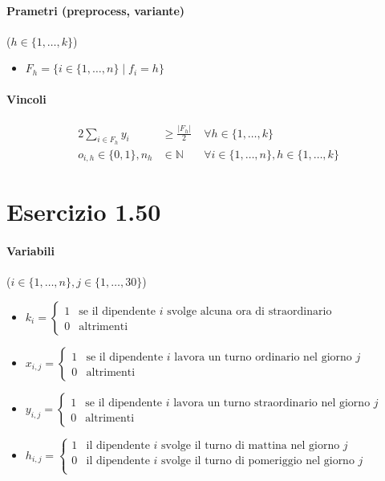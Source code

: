 \documentclass{article}
\begin{document}
\paragraph{Prametri (preprocess, variante)} ($h \in \{1,\ldots,k\}$)
\begin{itemize}
  \item $F_h = \{ i \in \{1,\ldots,n\} \mid f_i = h \}$
\end{itemize}

\paragraph{Vincoli}
\begin{alignat}{2}
  \sum_{i \in F_h} y_i &\geq \frac{|F_h|}{2} &\forall h \in \{1,\ldots,k\}\\
  o_{i,h} \in \{0,1\}, n_h &\in \mathbb{N} \quad &\forall i \in \{1,\ldots,n\}, h \in \{1,\ldots,k\}
\end{alignat}

\pagebreak
\section{Esercizio 1.50}

\paragraph{Variabili} ($i \in \{1,\ldots,n\}, j \in \{1,\ldots,30\}$)
\begin{itemize}
  \item $k_i = \begin{cases}
      1 &\text{se il dipendente }i\text{ svolge alcuna ora di straordinario} \\
      0 &\text{altrimenti}
    \end{cases}$
  \item $x_{i,j} = \begin{cases}
    1 &\text{se il dipendente }i\text{ lavora un turno ordinario nel giorno }j\\
    0 &\text{altrimenti}
  \end{cases}$
  \item $y_{i,j} = \begin{cases}
    1 &\text{se il dipendente }i\text{ lavora un turno straordinario nel giorno }j\\
    0 &\text{altrimenti}
  \end{cases}$
  \item $h_{i,j} = \begin{cases}
    1 &\text{il dipendente }i\text{ svolge il turno di mattina nel giorno }j\\
    0 &\text{il dipendente }i\text{ svolge il turno di pomeriggio nel giorno }j\\
  \end{cases}$
\end{itemize}
\end{document}
